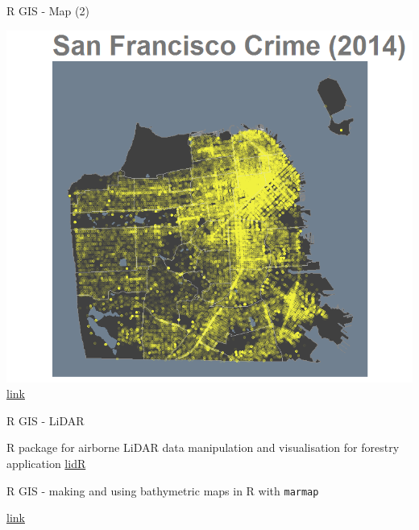 \documentclass[9pt,ignorenonframetext,]{beamer}
\begin{document}
\begin{frame}{R GIS - Map (2)}

\includegraphics{imgPres/map_SF_Crime2014.png}
\href{http://sharpsightlabs.com/blog/mapping-san-francisco-crime/}{link}

\end{frame}

\begin{frame}{R GIS - LiDAR}

R package for airborne LiDAR data manipulation and visualisation for
forestry application \href{https://github.com/Jean-Romain/lidR}{lidR}

\end{frame}

\begin{frame}{R GIS - making and using bathymetric maps in R with
\texttt{marmap}}

\href{https://www.ncbi.nlm.nih.gov/pmc/articles/PMC3760912/}{link}

\end{frame}
\end{document}

